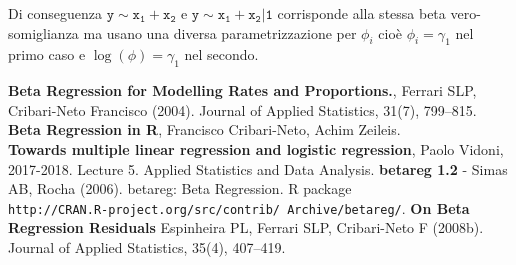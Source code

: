 \documentclass[twoside,twocolumn]{article}
\begin{document}
Di conseguenza $\mathtt{y \sim x_1+x_2}$ e $\mathtt{y \sim x_1+x_2 | 1}$ corrisponde alla stessa beta vero-somiglianza ma usano una diversa  parametrizzazione per $\phi_i$ cioè $\phi_i=\gamma_1$ nel primo caso e $\log(\phi)=\gamma_1$ nel secondo. 

\newpage
\tableofcontents
		\begin{thebibliography}{99} 
	 \textbf{Beta Regression for Modelling Rates and Proportions.}, Ferrari SLP, Cribari-Neto Francisco (2004).  Journal of Applied Statistics, 31(7), 799–815.
	 \textbf{Beta Regression in R}, Francisco Cribari-Neto, Achim Zeileis.\\
	 \textbf{Towards multiple linear regression and logistic regression}, Paolo Vidoni, 2017-2018. Lecture 5. Applied Statistics and Data Analysis.
	\textbf{betareg 1.2} - Simas AB, Rocha (2006). betareg: Beta Regression. R package \\ \texttt{http://CRAN.R-project.org/src/contrib/ Archive/betareg/}.
	\textbf{On Beta Regression Residuals} Espinheira PL, Ferrari SLP, Cribari-Neto F (2008b). Journal
of Applied Statistics, 35(4), 407–419.
	\end{thebibliography}
\end{document}
